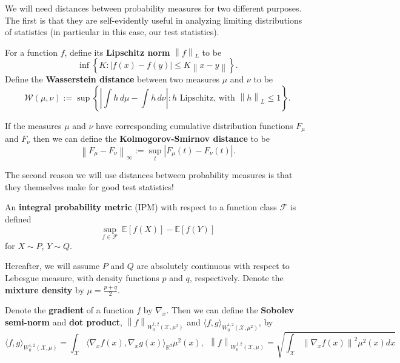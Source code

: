 \documentclass{article}
\newcommand{\Reals}{\mathbb{R}}
\newcommand{\Expect}[1]{\mathbb{E}\left[ #1 \right]}
\newcommand{\norm}[1]{\left\lVert#1\right\rVert}
\newcommand{\dotp}[2]{\langle #1 , #2 \rangle}
\newcommand{\abs}[1]{\left \lvert #1 \right \rvert}
\newcommand{\set}[1]{\left\{#1\right\}}
\newcommand{\F}{\mathcal{F}}
\newcommand{\X}{\mathcal{X}}
\newcommand{\Rd}{\Reals^d}
\theoremstyle{alden}
\theoremstyle{definition}
\theoremstyle{remark}
\begin{document}
We will need distances between probability measures for two different purposes. The first is that they are self-evidently useful in analyzing limiting distributions of statistics (in particular in this case, our test statistics).

For a function $f$, define its \textbf{Lipschitz norm} $\norm{f}_{L}$ to be
\begin{equation*}
\inf \set{K : \abs{f(x) - f(y)} \leq K \norm{x - y}}.
\end{equation*}
Define the \textbf{Wasserstein distance} between two measures $\mu$ and $\nu$ to be
\begin{equation*}
\mathcal{W}(\mu, \nu) := \sup \left \{ \abs{\int h \, d\mu - \int h \, d\nu}: h \text{ Lipschitz, with } \norm{h}_{L} \leq 1 \right\}.
\end{equation*}

If the measures $\mu$ and $\nu$ have corresponding cumulative distribution functions $F_{\mu}$ and $F_{\nu}$ then we can define the \textbf{Kolmogorov-Smirnov distance} to be
\begin{equation*}
\norm{F_\mu - F_\nu}_{\infty} := \sup_{t} \abs{F_{\mu}(t) - F_{\nu}(t)}.
\end{equation*}

The second reason we will use distances between probability measures is that they themselves make for good test statistics!

An \textbf{integral probability metric} (IPM) with respect to a function class $\F$ is defined
\begin{equation*}
\underset{f \in \F}{\sup} ~ \Expect{f(X)} - \Expect{f(Y)}
\end{equation*}
for $X \sim P$, $Y \sim Q$. 

Hereafter, we will assume $P$ and $Q$ are absolutely continuous with respect to Lebesgue measure, with density functions $p$ and $q$, respectively. Denote the \textbf{mixture density} by $\mu = \frac{p + q}{2}$. 

Denote the \textbf{gradient} of a function $f$ by $\nabla_x$. Then we can define the \textbf{Sobolev semi-norm} and \textbf{dot product}, $\norm{f}_{W_0^{1,2}(\X, \mu^2)}$ and $\dotp{f}{g}_{W_0^{1,2}(\X, \mu^2)}$, by
\begin{equation*}
\dotp{f}{g}_{W_0^{1,2}(\X, \mu)} = \int_{\X} \dotp{\nabla_x f(x)}{\nabla_x g(x)}_{\Rd} \mu^2(x), ~~ \norm{f}_{W_0^{1,2}(\X, \mu)} = \sqrt{\int_{\X} \norm{\nabla_x f(x)}^2 \mu^2(x) dx }
\end{equation*}
\end{document}
